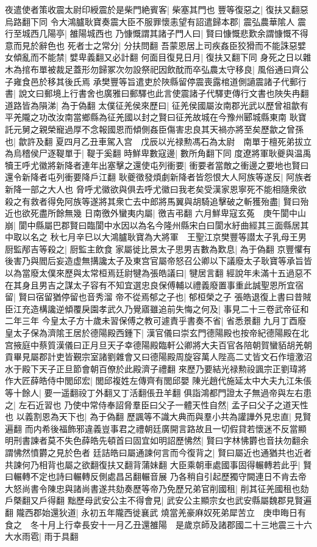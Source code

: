 夜遣使者策收震太尉印綬震於是柴門絶賓客|{
	柴塞其門也}
豐等復惡之|{
	復扶又翻惡烏路翻下同}
令大鴻臚耿寶奏震大臣不服罪懷恚望有詔遣歸本郡|{
	震弘農華隂人}
震行至城西几陽亭|{
	雒陽城西也}
乃慷慨謂其諸子門人曰|{
	賢曰慷慨悲歎余謂慷慨不得意而見於辭色也}
死者士之常分|{
	分扶問翻}
吾蒙恩居上司疾姦臣狡猾而不能誅惡嬖女傾亂而不能禁|{
	嬖卑義翻又必計翻}
何面目復見日月|{
	復扶又翻下同}
身死之日以雜木為捾布單被裁足蓋形勿歸冢次勿設祭祀因飲酖而卒弘農太守移良|{
	風俗通曰齊公子雍食邑於移其後氏焉}
承樊豐等旨遣吏於陜縣留停震喪露棺道側讁震諸子代郵行書|{
	說文曰郵境上行書舍也廣雅曰郵驛也此言使震諸子代驛吏傳行文書也陜失冉翻}
道路皆為隕涕|{
	為于偽翻}
太僕征羌侯來歷曰|{
	征羌侯國屬汝南郡光武以歷曾祖歙有平羌隴之功改汝南當鄉縣為征羌國以封之賢曰征羌故城在今豫州郾城縣東南}
耿寶託元舅之親榮寵過厚不念報國恩而傾側姦臣傷害忠良其天禍亦將至矣歷歙之曾孫也|{
	歙許及翻}
夏四月乙丑車駕入宫　戊辰以光禄勲馮石為太尉　南單于檀死弟拔立為烏稽侯尸逐鞮單于|{
	鞮于奚翻}
時鮮卑數寇邊|{
	數所角翻下同}
度遼將軍耿夔與温禹犢王呼尤徽將新降者連年出塞擊之還使屯列衝要|{
	衝要者當敵之衝邊之要地也賢曰還令新降者屯列衝要降戶江翻}
耿夔徵發煩劇新降者皆怨恨大人阿族等遂反|{
	阿族者新降一部之大人也}
脅呼尤徽欲與俱去呼尤徽曰我老矣受漢家恩寧死不能相隨衆欲殺之有救者得免阿族等遂將其衆亡去中郎將馬翼與胡騎追擊破之斬獲殆盡|{
	賢曰殆近也欲死盡所餘無幾}
日南徼外蠻夷内屬|{
	徼吉弔翻}
六月鮮卑寇玄菟　庚午閬中山崩|{
	閬中縣屬巴郡賢曰臨閬中水因以為名今隆州縣宋白曰閬水紆曲經其三面縣居其中取以名之}
秋七月辛巳以大鴻臚耿寶為大將軍　王聖江京樊豐等譛太子乳母王男厨監邴吉等殺之|{
	厨監主飲食}
家屬徙比景太子思男吉數為歎息|{
	為于偽翻}
京豐懼有後害乃與閻后妄造虚無搆讒太子及東宫官屬帝怒召公卿以下議廢太子耿寶等承旨皆以為當廢太僕來歷與太常桓焉廷尉犍為張皓議曰|{
	犍居言翻}
經說年未滿十五過惡不在其身且男吉之謀太子容有不知宜選忠良保傅輔以禮義廢置事重此誠聖恩所宜宿留|{
	賢曰宿留猶停留也音秀溜}
帝不從焉郁之子也|{
	郁桓榮之子}
張皓退復上書曰昔賊臣江充造構讒逆傾覆戾園孝武久乃覺寤雖追前失悔之何及|{
	事見二十三卷武帝征和二年三年}
今皇太子方十歲未習保傅之教可遽責乎書奏不省|{
	省悉景翻}
九月丁酉廢皇太子保為濟隂王居於德陽殿西鍾下|{
	漢官儀曰崇玄門德陽殿也按帝紀德陽殿在北宫掖庭中蔡質漢儀曰正月旦天子幸德陽殿臨軒公卿將大夫百官各陪朝賀蠻貊胡羌朝貢畢見屬郡計吏皆覲宗室諸劉雜會又曰德陽殿周旋容萬人陛高二丈皆文石作壇激沼水于殿下天子正旦節會朝百僚於此殿濟子禮翻}
來歷乃要結光禄勲祋諷宗正劉瑋將作大匠薛皓侍中閭邱宏|{
	閭邱複姓左傳齊有閭邱嬰}
陳光趙代施延太中大夫九江朱倀等十餘人|{
	要一遥翻祋丁外翻又丁活翻倀丑羊翻}
俱詣鴻都門證太子無過帝與左右患之|{
	左石近習也}
乃使中常侍奉詔脅羣臣曰父子一體天性自然|{
	孟子曰父子之道天性也}
以義割恩為天下也|{
	為于偽翻}
歷諷等不識大典而與羣小共為讙譁外見忠直|{
	見賢遍翻}
而内希後福飾邪違義豈事君之禮朝廷廣開言路故且一切假貸若懷迷不反當顯明刑書諫者莫不失色薛皓先頓首曰固宜如明詔歷怫然|{
	賢曰字林怫欝也音扶勿翻余謂怫然憤欝之見於色者}
廷詰皓曰屬通諫何言而今復背之|{
	賢曰屬近也通猶共也近者共諫何乃相背也屬之欲翻復扶又翻背蒲妹翻}
大臣乘朝車處國事固得輾轉若此乎|{
	賢曰輾轉不定也詩曰輾轉反側處昌呂翻輾音展}
乃各稍自引起歷獨守闕連日不肯去帝大怒尚書令陳忠與諸尚書遂共劾奏歷等帝乃免歷兄弟官削國租|{
	削其征羌國租也劾戶槩翻又戶得翻}
黜歷母武安公主不得會見|{
	武安公主顯宗女也武安縣屬魏郡見賢遍翻}
隴西郡始還狄道|{
	永初五年隴西徙襄武}
燒當羌豪麻奴死弟犀苦立　庚申晦日有食之　冬十月上行幸長安十一月乙丑還雒陽　是歲京師及諸郡國二十三地震三十六大水雨雹|{
	雨于具翻}


